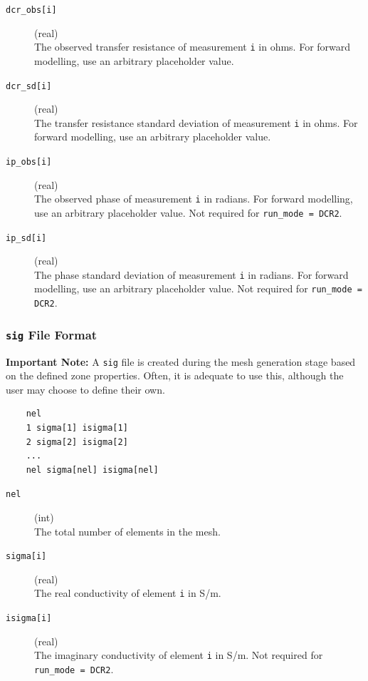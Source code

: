 \documentclass[a4paper,12pt]{article}
\begin{document}
\begin{description}
    \item[\texttt{dcr\_obs[i]}] (real)\hfill \\
          The observed transfer resistance of measurement \texttt{i} in ohms. For forward modelling, use an arbitrary placeholder value.

    \item[\texttt{dcr\_sd[i]}] (real)\hfill \\
          The transfer resistance standard deviation of measurement \texttt{i} in ohms. For forward modelling, use an arbitrary placeholder value.

    \item[\texttt{ip\_obs[i]}] (real)\hfill \\
          The observed phase of measurement \texttt{i} in radians. For forward modelling, use an arbitrary placeholder value. Not required for \texttt{run\_mode = DCR2}.

    \item[\texttt{ip\_sd[i]}] (real)\hfill \\
          The phase standard deviation of measurement \texttt{i} in radians. For forward modelling, use an arbitrary placeholder value. Not required for \texttt{run\_mode = DCR2}.
\end{description}

\newpage
\subsubsection{\texttt{sig} File Format} \label{forward_sig}

\begin{framed}
    \noindent \textbf{Important Note:} A \texttt{sig} file is created during the mesh generation stage based on the defined zone properties. Often, it is adequate to use this, although the user may choose to define their own.
\end{framed}

\begin{framed}
    \begin{verbatim}
    nel
    1 sigma[1] isigma[1]
    2 sigma[2] isigma[2]
    ...
    nel sigma[nel] isigma[nel]
\end{verbatim}
\end{framed}

\begin{description}
    \item[\texttt{nel}] (int)\hfill \\
          The total number of elements in the mesh.

    \item[\texttt{sigma[i]}] (real)\hfill \\
          The real conductivity of element \texttt{i} in S/m.

    \item[\texttt{isigma[i]}] (real)\hfill \\
          The imaginary conductivity of element \texttt{i} in S/m.  Not required for \texttt{run\_mode = DCR2}.
\end{description}
\end{document}
